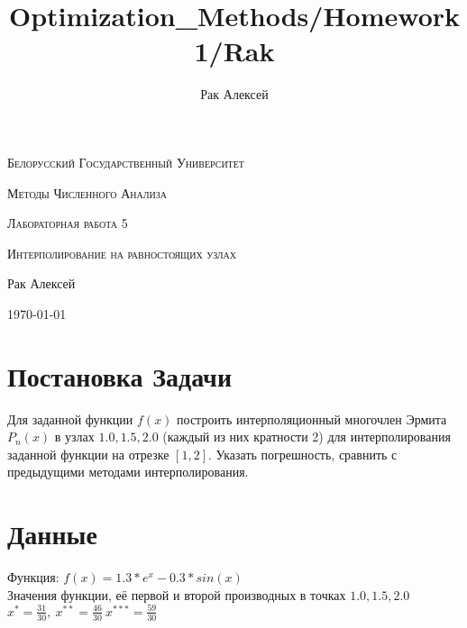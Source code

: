 \documentclass[10pt]{scrartcl}
\begin{document}
\author{Рак Алексей}
\title{Optimization_Methods/Homework1/Rak}
\begin{titlepage}
		\centering
		{\scshape\LARGE Белорусский Государственный Университет \par}
        \vfill
        {\scshape\LARGE Методы Численного Анализа\par}
        \vspace{1cm}
        {\scshape\LARGE Лабораторная работа 5\par}
        \vspace{1cm}
        {\scshape\LARGE Интерполирование на равностоящих узлах\par}
        \vspace{2cm}
        {\LARGE Рак Алексей\par}
        \vfill
        {\large \today}
\end{titlepage}
\section*{Постановка Задачи}\noindent
Для заданной функции $f(x)$ построить интерполяционный многочлен Эрмита $P_n(x)$ в узлах $1.0, 1.5, 2.0$ (каждый из них кратности 2) для интерполирования заданной функции на отрезке $[1, 2]$. Указать
погрешность, сравнить с предыдущими методами интерполирования.
\section*{Данные}\noindent
Функция: $f(x) = 1.3 * e^x - 0.3 * sin(x)$\\
Значения функции, её первой и второй производных в точках $1.0, 1.5, 2.0$\\
$x^{*} = \frac{31}{30}, \ x^{**} = \frac{46}{30} \ x^{***} = \frac{59}{30}$
\end{document}
